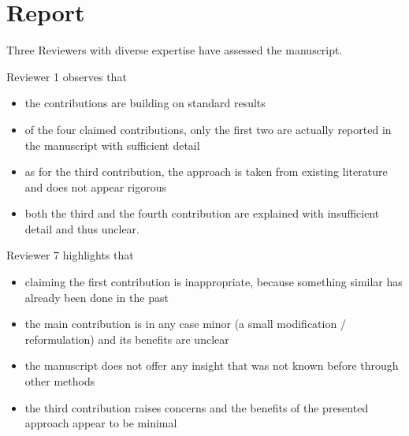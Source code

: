 \vspace{-15pt}
\section*{Report}
Three Reviewers with diverse expertise have assessed the manuscript.

Reviewer 1 observes that
\vspace{-7pt}
\begin{itemize}[nosep]
    \item {%
        the contributions are building on standard results
    }%
    \item{%
        of the four claimed contributions, only the first two are actually reported in the manuscript with sufficient detail
    }%
    \item{%
        as for the third contribution, the approach is taken from existing literature and does not appear rigorous
    }%
    \item{%
        both the third and the fourth contribution are explained with insufficient detail and thus unclear.
    }%
\end{itemize}

Reviewer 7 highlights that
\vspace{-7pt}
\begin{itemize}[nosep]
    \item {%
        claiming the first contribution is inappropriate, because something similar has already been done in the past
    }%
    \item{%
        the main contribution is in any case minor (a small modification / reformulation) and its benefits are unclear
    }%
    \item{%
        the manuscript does not offer any insight that was not known before through other methods
    }%
    \item{%
        the third contribution raises concerns and the benefits of the presented approach appear to be minimal
    }%
\end{itemize}


